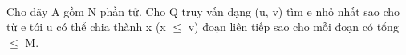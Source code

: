  

Cho dãy A gồm N phần tử. Cho Q truy vấn dạng (u, v) tìm e nhỏ nhất sao cho từ e tới u có thể chia thành x (x  $\le$  v) đoạn liên tiếp sao cho mỗi đoạn có tổng  $\le$  M.

\